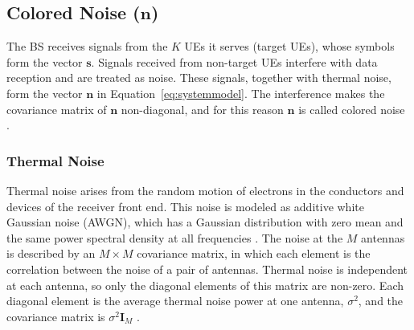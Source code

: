 \subsection{Colored Noise (\texorpdfstring{$\mathbf n$}{n})}\label{subsec:interferencia}
The BS receives signals from the $K$ UEs it serves (target UEs), whose symbols form the vector $\mathbf s$. Signals received from non-target UEs interfere with data reception and are treated as noise. These signals, together with thermal noise, form the vector $\mathbf n$ in Equation~\ref{eq:systemmodel}. The interference makes the covariance matrix of $\mathbf n$ non-diagonal, and for this reason $\mathbf n$ is called colored noise \cite{zhao2025jsac}.

\subsubsection{Thermal Noise}\label{subsubsec:ruido-termico}
Thermal noise arises from the random motion of electrons in the conductors and devices of the receiver front end. This noise is modeled as additive white Gaussian noise (AWGN), which has a Gaussian distribution with zero mean and the same power spectral density at all frequencies \cite{haykin,tse-viswanath}. The noise at the $M$ antennas is described by an $M \times M$ covariance matrix, in which each element is the correlation between the noise of a pair of antennas. Thermal noise is independent at each antenna, so only the diagonal elements of this matrix are non-zero. Each diagonal element is the average thermal noise power at one antenna, $\sigma^2$, and the covariance matrix is $\sigma^2\mathbf I_M$ \cite{zhao2025jsac}.
